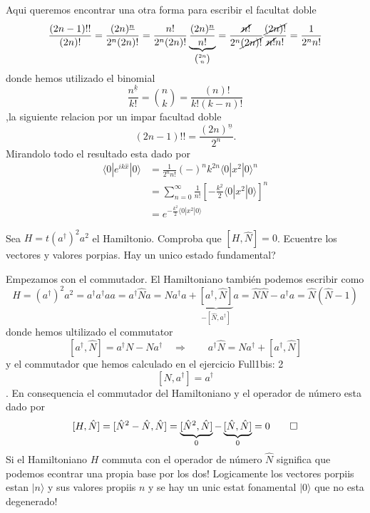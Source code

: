 Aqui queremos encontrar una otra forma para escribir el facultat doble
$$
	\frac{(2n-1)!!}{(2n)!} = \frac{(2n)^{\underline{n}}}{2^n (2n)!} =
\frac{n!}{2^n(2n)!} \underbrace{\frac{(2n)^{\underline{n}}}{n!}}_{\binom{2n}{n}}
= \frac{\cancel{n!}}{2^n \cancel{(2n)!}} \frac{\cancel{(2n)!}}{\cancel{n!} n!} =
\frac{1}{2^n n!}
$$
donde hemos utilizado el binomial
$$
	\frac{n^{\underline{k}}}{k!} = \binom{n}{k} = \frac{(n)!}{k!(k-n)!}
$$ 
,la siguiente relacion por un impar facultad doble
$$
	(2n - 1)!! = \frac{(2n)^{\underline{n}}}{2^n}.
$$
Mirandolo todo el resultado esta dado por
\begin{align*}
	\langle 0 | e^{ik\hat x} | 0 \rangle &= \frac{1}{2^n n!} (-)^n k^{2n} \langle
0 | x^2 | 0 \rangle^n  \\
	&= \sum_{n=0}^\infty \frac{1}{n!} \left[ - \frac{k^2}{2} \langle 0 | x^2 | 0
\rangle \right]^n \\
	&= e^{-\frac{k^2}{2} \langle 0 | x^2 | 0 \rangle}
\end{align*}

\begin{ejercicio}
Sea $H = t (a^{\dagger})^2 a^2$ el Hamiltonio. Comproba que $[H, \hat N] =
0$. Ecuentre los vectores y valores porpias. Hay un unico estado fundamental?
\end{ejercicio}
\begin{solucion}
Empezamos con el commutador. El Hamiltoniano también podemos escribir como
$$
	H = (a^\dagger)^2 a^2 = a^\dagger a^\dagger a a = a^\dagger \hat N a = \hat
N a^\dagger a + \underbrace{[a^\dagger, \hat N]}_{-[\hat N, a^\dagger]}a = \hat
N \hat N - a^\dagger a = \hat N ( \hat N - 1) 
$$
donde hemos ultilizado el commutator 
$$
	[a^\dagger, \hat N] = a^\dagger N - N a^\dagger \quad \Rightarrow \qquad
a^\dagger \hat N = N a^\dagger + [a^\dagger, \hat N]
$$ y el commutador que hemos calculado en el ejercicio Full1bis: 2
$$
	[N, a^\dagger] = a^\dagger
$$.
En consequencia el commutador del Hamiltoniano y el operador de número esta dado
por
$$
	[H, \hat N] = [\hat N^2 - \hat N, \hat N] = \underbrace{[\hat N^2, \hat
N]}_0 - \underbrace{[\hat N, \hat N]}_0 = 0 \qed
$$
Si el Hamiltoniano $H$ commuta con el operador de número $\hat N$ significa que
podemos econtrar una propia base por los dos! Logicamente los vectores porpiis
estan $|n\rangle$ y sus valores propiis $n$ y se hay un unic estat fonamental
$|0\rangle$ que no esta degenerado! 
\end{solucion}

